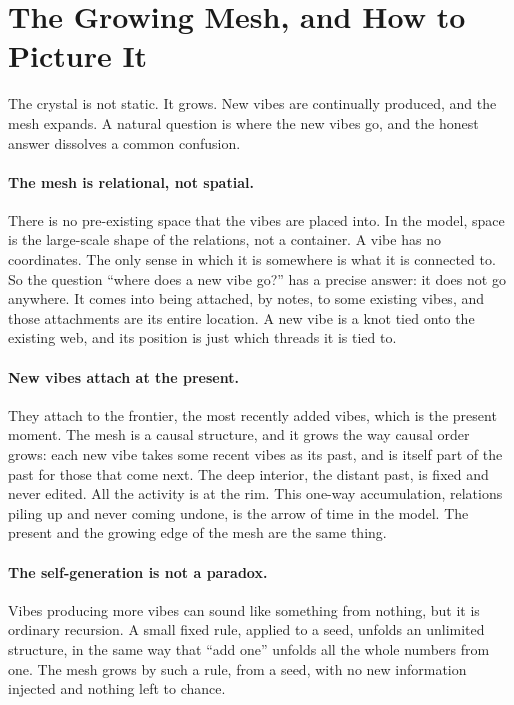 \section{The Growing Mesh, and How to Picture It}
\label{sec:growth}

The crystal is not static. It grows. New vibes are continually produced, and the mesh expands.
A natural question is where the new vibes go, and the honest answer dissolves a common
confusion.

\paragraph{The mesh is relational, not spatial.}
There is no pre-existing space that the vibes are placed into. In the model, space is the
large-scale shape of the relations, not a container. A vibe has no coordinates. The only sense
in which it is somewhere is what it is connected to. So the question ``where does a new vibe
go?'' has a precise answer: it does not go anywhere. It comes into being attached, by notes, to
some existing vibes, and those attachments are its entire location. A new vibe is a knot tied
onto the existing web, and its position is just which threads it is tied to.

\paragraph{New vibes attach at the present.}
They attach to the frontier, the most recently added vibes, which is the present moment. The
mesh is a causal structure, and it grows the way causal order grows: each new vibe takes some
recent vibes as its past, and is itself part of the past for those that come next. The deep
interior, the distant past, is fixed and never edited. All the activity is at the rim. This
one-way accumulation, relations piling up and never coming undone, is the arrow of time in the
model. The present and the growing edge of the mesh are the same thing.

\paragraph{The self-generation is not a paradox.}
Vibes producing more vibes can sound like something from nothing, but it is ordinary recursion.
A small fixed rule, applied to a seed, unfolds an unlimited structure, in the same way that
``add one'' unfolds all the whole numbers from one. The mesh grows by such a rule, from a seed,
with no new information injected and nothing left to chance.

